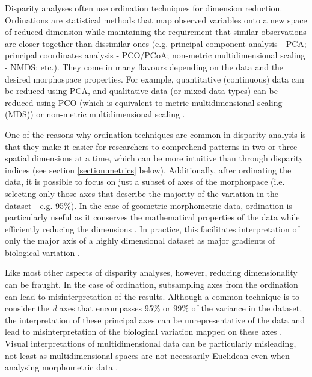 \documentclass[12pt,letterpaper]{article}
\begin{document}
Disparity analyses often use ordination techniques for dimension reduction.
Ordinations are statistical methods that map observed variables onto a new space of reduced dimension while maintaining the requirement that similar observations are closer together than dissimilar ones (e.g. principal component analysis - PCA; principal coordinates analysis - PCO/PCoA; non-metric multidimensional scaling - NMDS; etc.).
They come in many flavours depending on the data and the desired morphospace properties.
For example, quantitative (continuous) data can be reduced using PCA, and qualitative data (or mixed data types) can be reduced using PCO (which is equivalent to metric multidimensional scaling (MDS)) or non-metric multidimensional scaling \citep[NMDS; see][chapter 9 for a detailed overview of ordination methods and properties]{Legendre2012}.

One of the reasons why ordination techniques are common in disparity analysis is that they make it easier for researchers to comprehend patterns in two or three spatial dimensions at a time, which can be more intuitive than through disparity indices (see section \ref{section:metrics} below).
Additionally, after ordinating the data, it is possible to focus on just a subset of axes of the morphospace (i.e.
selecting only those axes that describe the majority of the variation in the dataset - e.g. 95\%).
In the case of geometric morphometric data, ordination is particularly useful as it conserves the mathematical properties of the data while efficiently reducing the dimensions \citep{Legendre2012,dryden2016statistical}.
In practice, this facilitates interpretation of only the major axis of a highly dimensional dataset as major gradients of biological variation \citep[e.g. the elongation and flattening of birds beaks;][]{bright2016shapes}.

Like most other aspects of disparity analyses, however, reducing dimensionality can be fraught.
In the case of ordination, subsampling axes from the ordination can lead to misinterpretation of the results.
Although a common technique is to consider the \textit{d} axes that encompasses 95\% or 99\% of the variance in the dataset, the interpretation of these principal axes can be unrepresentative of the data and lead to misinterpretation of the biological variation mapped on these axes \citep{Bookstein2015, Weisbecker2019}.
Visual interpretations of multidimensional data can be particularly misleading, not least as multidimensional spaces are not necessarily Euclidean even when analysing morphometric data \citep{Deline2018, Gerber2017}.
\end{document}
